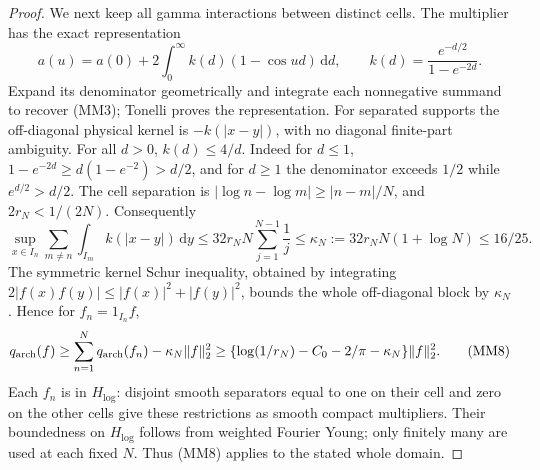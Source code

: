\documentclass[11pt]{article}
\theoremstyle{remark}\newtheorem{remark}[theorem]{Remark}
\newcommand{\dd}{\,\mathrm d}
\begin{document}
\begin{proof}
We next keep all gamma interactions between distinct cells.
The multiplier has the exact representation
\[
 a(u)=a(0)+2\int_0^\infty k(d)(1-\cos ud)\dd d,\qquad
 k(d)=\frac{e^{-d/2}}{1-e^{-2d}}. \tag{MM6}
\]
Expand its denominator geometrically and integrate each nonnegative
summand to recover (MM3); Tonelli proves the representation.
For separated supports the off-diagonal physical kernel is
$-k(|x-y|)$, with no diagonal finite-part ambiguity.
For all $d>0$, $k(d)\le4/d$. Indeed for $d\le1$,
$1-e^{-2d}\ge d(1-e^{-2})>d/2$, and for $d\ge1$ the
denominator exceeds $1/2$ while $e^{d/2}>d/2$.
The cell separation is
$|\log n-\log m|\ge|n-m|/N$, and $2r_N<1/(2N)$.
Consequently
\[
 \sup_{x\in I_n}\sum_{m\ne n}\int_{I_m}k(|x-y|)\dd y
 \le32r_NN\sum_{j=1}^{N-1}\frac1j
 \le\kappa_N:=32r_NN(1+\log N)\le16/25. \tag{MM7}
\]
The symmetric kernel Schur inequality, obtained by integrating
$2|f(x)f(y)|\le|f(x)|^2+|f(y)|^2$, bounds the whole
off-diagonal block by $\kappa_N$. Hence for $f_n=1_{I_n}f$,
\[
 q_{\rm arch}(f)\ge
       \sum_{n=1}^N q_{\rm arch}(f_n)-\kappa_N\|f\|_2^2
 \ge\{\log(1/r_N)-C_0-2/\pi-\kappa_N\}\|f\|_2^2. \tag{MM8}
\]
Each $f_n$ is in $H_{\log}$: disjoint smooth separators equal to
one on their cell and zero on the other cells give these restrictions
as smooth compact multipliers. Their boundedness on $H_{\log}$
follows from weighted Fourier Young; only finitely many are used
at each fixed $N$. Thus (MM8) applies to the stated whole domain.


\end{proof}
\end{document}
